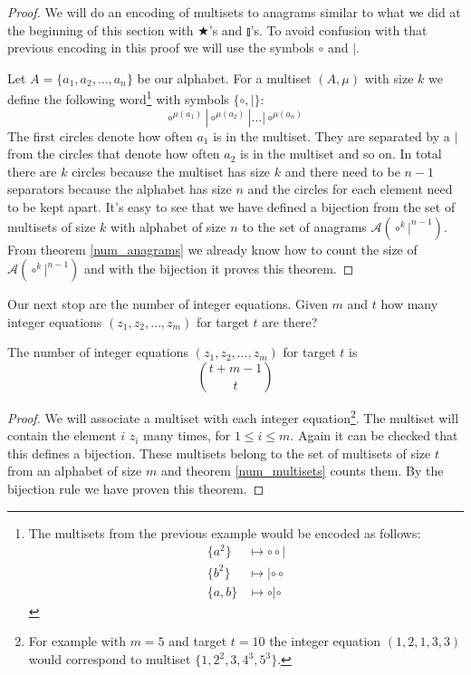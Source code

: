 \begin{proof}
We will do an encoding of multisets to anagrams similar to what we did at the beginning of this section with $\bigstar$'s and $\talloblong$'s. To avoid confusion with that previous encoding in this proof we will use the symbols $\circ$ and $|$.

Let $A=\{a_1, a_2, \ldots, a_n\}$ be our alphabet. For a multiset $(A, \mu)$ with size $k$ we define the following word\footnote{The multisets from the previous example would be encoded as follows:
\begin{align*}
\{a^2\} & \mapsto \circ\circ|\\
\{b^2\} & \mapsto |\circ\circ\\
\{a, b\} & \mapsto \circ|\circ
\end{align*}} with symbols $\{\circ,|\}$:
$$
\circ^{\mu(a_1)}|\circ^{\mu(a_2)}| \ldots |\circ^{\mu(a_n)}
$$
The first circles denote how often $a_1$ is in the multiset. They are separated by a $|$ from the circles that denote how often $a_2$ is in the multiset and so on. In total there are $k$ circles because the multiset has size $k$ and there need to be $n-1$ separators because the alphabet has size $n$ and the circles for each element need to be kept apart. It's easy to see that we have defined a bijection from the set of multisets of size $k$ with alphabet of size $n$ to the set of anagrams $\mathcal{A}(\circ^k|^{n-1})$. From theorem \ref{num_anagrams} we already know how to count the size of $\mathcal{A}(\circ^k|^{n-1})$ and with the bijection it proves this theorem.
\end{proof}

Our next stop are the number of integer equations. Given $m$ and $t$ how many integer equations $(z_1, z_2, \ldots, z_m)$ for target $t$ are there?

\begin{thm}\label{num_int_equations}
The number of integer equations $(z_1, z_2, \ldots, z_m)$ for target $t$ is
$$
\binom{t + m - 1}{t}
$$
\end{thm}

\begin{proof}
We will associate a multiset with each integer equation\footnote{For example with $m = 5$ and target $t = 10$ the integer equation $(1, 2, 1, 3, 3)$ would correspond to multiset $\{1, 2^2, 3, 4^3, 5^3\}$.}. The multiset will contain the element $i$ $z_i$ many times, for $1 \leq i \leq m$. Again it can be checked that this defines a bijection. These multisets belong to the set of multisets of size $t$ from an alphabet of size $m$ and theorem \ref{num_multisets} counts them. By the bijection rule we have proven this theorem.
\end{proof}

